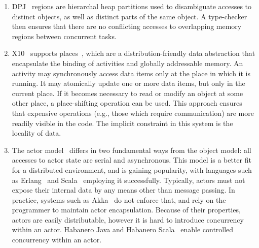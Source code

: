 \documentclass[]{usiinfprospectus}
\begin{document}
\begin{enumerate}
	\item DPJ~\cite{bocchino2009parallel} regions are hierarchal heap partitions used to disambiguate accesses to distinct objects, as well as distinct parts of the same object. A type-checker then ensures that there are no conflicting accesses to overlapping memory regions between concurrent tasks.
	
	\item X10~\cite{charles2005x10} supports places~\cite{x10spec}, which are  a distribution-friendly data abstraction that encapsulate the binding of activities and globally addressable memory. An activity may synchronously access data items only at the place in which it is running. It may atomically update one or more data items, but only in the current place. If it becomes necessary to read or modify an object at some other place, a place-shifting operation can be used. This approach ensures that expensive operations (e.g., those which require communication) are more readily visible in the code. The implicit constraint in this system is the locality of data.  
	
	\item The actor model~\cite{agha1985actors} differs in two fundamental ways from the object model: all accesses to actor state are serial and asynchronous. This model is a better fit for a distributed environment, and is gaining popularity, with languages such as Erlang~\cite{armstrong1993concurrent} and Scala~\cite{odersky2004overview} employing it successfully. Typically, actors must not expose their internal data by any means other than message passing. In practice, systems such as Akka~\cite{akka} do not enforce that, and rely on the programmer to maintain actor encapsulation. Because of their properties, actors are easily distributable, however it is hard to introduce concurrency within an actor. Habanero Java and Habanero Scala~\cite{imam2012integrating} enable controlled concurrency within an actor. 
\end{enumerate}
\end{document}
